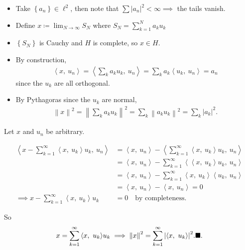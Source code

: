 \begin{solution}[part b]

\envlist

\begin{itemize}
\item
  Take \(\left\{{a_n}\right\} \in \ell^2\), then note that
  \(\sum {\left\lvert {a_n} \right\rvert}^2 < \infty \implies\) the
  tails vanish.
\item
  Define \(x \coloneqq\displaystyle\lim_{N\to\infty} S_N\) where
  \(S_N = \sum_{k=1}^N a_k u_k\)
\item
  \(\left\{{S_N}\right\}\) is Cauchy and \(H\) is complete, so
  \(x\in H\).
\item
  By construction,
  \begin{align*}
  {\left\langle {x},~{u_n} \right\rangle} = {\left\langle {\sum_k a_k u_k},~{u_n} \right\rangle} = \sum_k a_k {\left\langle {u_k},~{u_n} \right\rangle} = a_n 
  \end{align*}
  since the \(u_k\) are all orthogonal.
\item
  By Pythagoras since the \(u_k\) are normal,
  \begin{align*}
  {\left\lVert {x} \right\rVert}^2 = {\left\lVert {\sum_k a_k u_k} \right\rVert}^2 = \sum_k {\left\lVert {a_k u_k} \right\rVert}^2 = \sum_k {\left\lvert {a_k} \right\rvert}^2
  .\end{align*}
\end{itemize}

\end{solution}

\begin{solution}[part c]

Let \(x\) and \(u_n\) be arbitrary.

\begin{align*}
{\left\langle {x - \sum_{k=1}^\infty {\left\langle {x},~{u_k} \right\rangle}u_k },~{u_n} \right\rangle}
&=
{\left\langle {x},~{u_n} \right\rangle}
-
{\left\langle {\sum_{k=1}^\infty {\left\langle {x},~{u_k} \right\rangle}u_k },~{u_n} \right\rangle} \\
&=
{\left\langle {x},~{u_n} \right\rangle}
-
\sum_{k=1}^\infty  {\left\langle {{\left\langle {x},~{u_k} \right\rangle}u_k },~{u_n} \right\rangle} \\
&=
{\left\langle {x},~{u_n} \right\rangle}
-
\sum_{k=1}^\infty  {\left\langle {x},~{u_k} \right\rangle} {\left\langle {u_k },~{u_n} \right\rangle} \\
&= {\left\langle {x},~{u_n} \right\rangle} - {\left\langle {x},~{u_n} \right\rangle} = 0 \\
\implies 
x - \sum_{k=1}^\infty {\left\langle {x},~{u_k} \right\rangle}u_k &= 0 \quad\text{by completeness}
.\end{align*}

So
\begin{align*}
x = \sum_{k=1}^\infty {\left\langle {x},~{u_k} \right\rangle} u_k
\implies
{\left\lVert {x} \right\rVert}^2 = \sum_{k=1}^\infty {\left\lvert {{\left\langle {x},~{u_k} \right\rangle}} \right\rvert}^2. \hfill\blacksquare
.\end{align*}

\end{solution}

